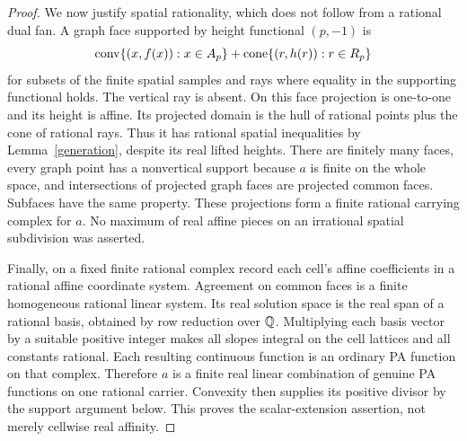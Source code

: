 \documentclass[11pt]{article}
\theoremstyle{definition}\newtheorem{definition}[theorem]{Definition}
\theoremstyle{remark}\newtheorem{remark}[theorem]{Remark}
\begin{document}
\begin{proof}
We now justify spatial rationality, which does not follow from a rational dual fan. A graph face supported by height functional $(p,-1)$ is
\[
\operatorname{conv}\{(x,f(x)):x\in A_p\}+\operatorname{cone}\{(r,h(r)):r\in R_p\}
\]
for subsets of the finite spatial samples and rays where equality in the supporting functional holds. The vertical ray is absent. On this face projection is one-to-one and its height is affine. Its projected domain is the hull of rational points plus the cone of rational rays. Thus it has rational spatial inequalities by Lemma~\ref{generation}, despite its real lifted heights. There are finitely many faces, every graph point has a nonvertical support because $a$ is finite on the whole space, and intersections of projected graph faces are projected common faces. Subfaces have the same property. These projections form a finite rational carrying complex for $a$. No maximum of real affine pieces on an irrational spatial subdivision was asserted.

Finally, on a fixed finite rational complex record each cell's affine coefficients in a rational affine coordinate system. Agreement on common faces is a finite homogeneous rational linear system. Its real solution space is the real span of a rational basis, obtained by row reduction over $\mathbb Q$. Multiplying each basis vector by a suitable positive integer makes all slopes integral on the cell lattices and all constants rational. Each resulting continuous function is an ordinary PA function on that complex. Therefore $a$ is a finite real linear combination of genuine PA functions on one rational carrier. Convexity then supplies its positive divisor by the support argument below. This proves the scalar-extension assertion, not merely cellwise real affinity.
\end{proof}
\end{document}
